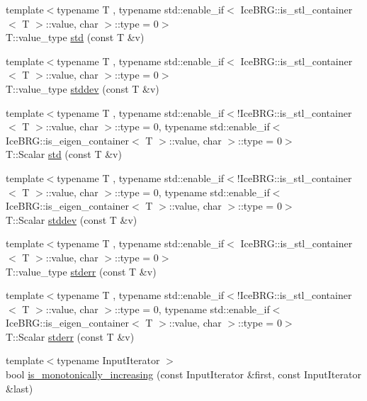 \begin{DoxyCompactItemize}
\item 
{\footnotesize template$<$typename T , typename std\-::enable\-\_\-if$<$ Ice\-B\-R\-G\-::is\-\_\-stl\-\_\-container$<$ T $>$\-::value, char $>$\-::type  = 0$>$ }\\T\-::value\-\_\-type \hyperlink{namespaceIceBRG_af864d5f683b2b6c9be2c4175c77a1a6b}{std} (const T \&v)
\item 
{\footnotesize template$<$typename T , typename std\-::enable\-\_\-if$<$ Ice\-B\-R\-G\-::is\-\_\-stl\-\_\-container$<$ T $>$\-::value, char $>$\-::type  = 0$>$ }\\T\-::value\-\_\-type \hyperlink{namespaceIceBRG_abd6d34ef6f0ad79c2aad4ba53bddc304}{stddev} (const T \&v)
\item 
{\footnotesize template$<$typename T , typename std\-::enable\-\_\-if$<$!\-Ice\-B\-R\-G\-::is\-\_\-stl\-\_\-container$<$ T $>$\-::value, char $>$\-::type  = 0, typename std\-::enable\-\_\-if$<$ Ice\-B\-R\-G\-::is\-\_\-eigen\-\_\-container$<$ T $>$\-::value, char $>$\-::type  = 0$>$ }\\T\-::\-Scalar \hyperlink{namespaceIceBRG_a89437436d5ee2c84abd195ad919e455b}{std} (const T \&v)
\item 
{\footnotesize template$<$typename T , typename std\-::enable\-\_\-if$<$!\-Ice\-B\-R\-G\-::is\-\_\-stl\-\_\-container$<$ T $>$\-::value, char $>$\-::type  = 0, typename std\-::enable\-\_\-if$<$ Ice\-B\-R\-G\-::is\-\_\-eigen\-\_\-container$<$ T $>$\-::value, char $>$\-::type  = 0$>$ }\\T\-::\-Scalar \hyperlink{namespaceIceBRG_a97d7a8e516f72dd60d5a2a9f48b0afa4}{stddev} (const T \&v)
\item 
{\footnotesize template$<$typename T , typename std\-::enable\-\_\-if$<$ Ice\-B\-R\-G\-::is\-\_\-stl\-\_\-container$<$ T $>$\-::value, char $>$\-::type  = 0$>$ }\\T\-::value\-\_\-type \hyperlink{namespaceIceBRG_a160ebe50855051da278febcc1dacb505}{stderr} (const T \&v)
\item 
{\footnotesize template$<$typename T , typename std\-::enable\-\_\-if$<$!\-Ice\-B\-R\-G\-::is\-\_\-stl\-\_\-container$<$ T $>$\-::value, char $>$\-::type  = 0, typename std\-::enable\-\_\-if$<$ Ice\-B\-R\-G\-::is\-\_\-eigen\-\_\-container$<$ T $>$\-::value, char $>$\-::type  = 0$>$ }\\T\-::\-Scalar \hyperlink{namespaceIceBRG_a1386f337d1cddabb7e330b1ba3656a02}{stderr} (const T \&v)
\item 
{\footnotesize template$<$typename Input\-Iterator $>$ }\\bool \hyperlink{namespaceIceBRG_a4872db04b3f0c65e61fc720b24db1260}{is\-\_\-monotonically\-\_\-increasing} (const Input\-Iterator \&first, const Input\-Iterator \&last)

\end{DoxyCompactItemize}
